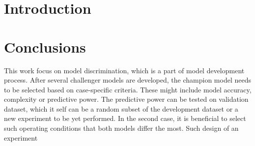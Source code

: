 \documentclass[a4paper,fleqn]{cas-dc}
\begin{document}
\maketitle


\section{Introduction}








%




%

\section{Conclusions} \label{CH: Conclusion}

This work focus on model discrimination, which is a part of model development process. After several challenger models are developed, the champion model needs to be selected based on case-specific criteria. These might include model accuracy, complexity or predictive power. The predictive power can be tested on validation dataset, which it self can be a random subset of the development dataset or a new experiment to be yet performed. In the second case, it is beneficial to select such operating conditions that both models differ the most. Such design of an experiment 


\newpage
%


\end{document}

